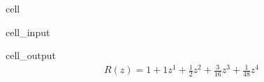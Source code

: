 \documentclass[letterpaper,10pt,english]{jupyterBook}
\begin{document}
\begin{sphinxuseclass}{cell}
\begin{sphinxVerbatimInput}
\begin{sphinxuseclass}{cell_input}
\begin{sphinxVerbatim}[commandchars=\\\{\}]
\end{sphinxVerbatim}

\end{sphinxuseclass}\end{sphinxVerbatimInput}
\begin{sphinxVerbatimOutput}

\begin{sphinxuseclass}{cell_output}\begin{equation*}
\begin{split}\displaystyle R(z) = 1 + 1 z^1 + \frac{1}{2} z^2 + \frac{3}{16} z^3 + \frac{1}{48} z^4\end{split}
\end{equation*}
\end{sphinxuseclass}\end{sphinxVerbatimOutput}

\end{sphinxuseclass}
\sphinxstepscope
\end{document}
